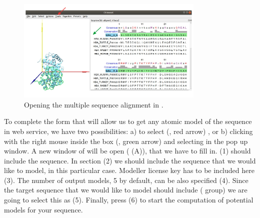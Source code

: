 \begin{itemize}
 \begin{figure}[H]
  \centering 
  \captionsetup{width=.7\linewidth} 
  \includegraphics[width=0.80\textwidth]{Images/Fig14}
  \caption{Opening the multiple sequence alignment in \chimera.}
  \label{fig:chimera_alignment}
  \end{figure}
\end{itemize}

To complete the form that will allow us to get any atomic model of the  sequence in \modeller web service, we have two possibilities: a) to select  (, red arrow) , or b) clicking with the right mouse inside the  box (, green arrow) and selecting  in the pop up window. A new window of  will be open ( (A)), that we have to fill in.  (1) should include the  sequence. In  section (2) we should include the  sequence that we would like to model,  in this particular case. Modeller license key has to be included here (3). The number of output models, 5 by default, can be also specified (4). Since the target sequence that we would like to model should include  ( group) we are going to select this as  (5). Finally, press  (6) to start the computation of potential models for your  sequence.\\

